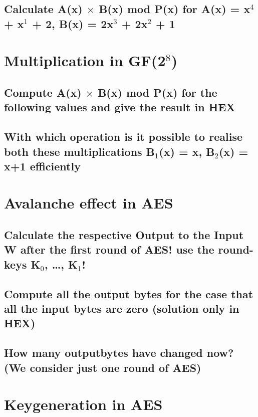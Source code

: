 \subsection{Calculate A(x) $\times$ B(x) mod P(x) for A(x) = x$^{4}$ + x$^{1}$ + 2, B(x) = 2x$^{3}$ + 2x$^{2}$ + 1}
\label{section:2d}

\section{Multiplication in GF(2$^{8}$)}

\subsection{Compute A(x) $\times$ B(x) mod P(x) for the following values and give the result in HEX}
\label{section:3a}

\subsection{With which operation is it possible to realise both these multiplications B$_{1}$(x) = x, B$_{2}$(x) = x+1 efficiently}
\label{section:3b}

\section{Avalanche effect in AES}

\subsection{Calculate the respective Output to the Input W after the first round of AES! use the round-keys K$_{0}$, \ldots, K$_{1}$!}
\label{section:4a}

\subsection{Compute all the output bytes for the case that all the input bytes are zero (solution only in HEX)}
\label{section:4b}

\subsection{How many outputbytes have changed now? (We consider just one round of AES)}
\label{section:4c}

\section{Keygeneration in AES}

